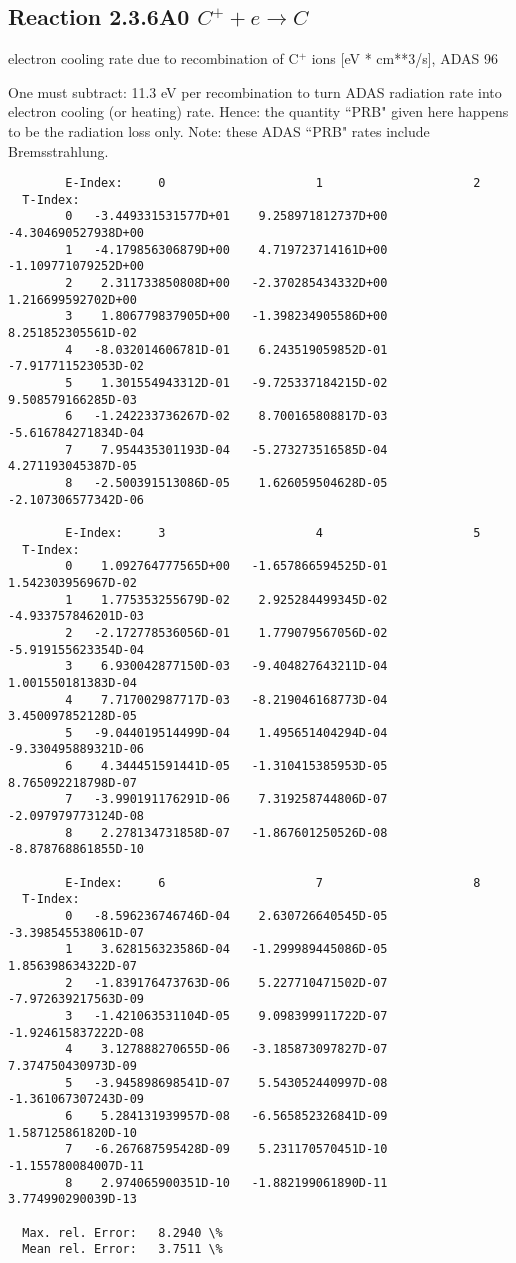 \documentclass[12pt,dvipdfmx]{article}
\begin{document}
\subsection{
  Reaction 2.3.6A0  $C^+ + e \rightarrow C  $
}
electron cooling rate due to recombination of C$^+$ ions [eV * cm**3/s],
ADAS 96

One must subtract: 11.3 eV per recombination to turn ADAS radiation
rate into electron cooling (or heating) rate. Hence: the quantity
``PRB" given here happens to be the radiation loss only. Note: these
ADAS ``PRB" rates include Bremsstrahlung.

\begin{small}\begin{verbatim}
        E-Index:     0                     1                     2
  T-Index:
        0   -3.449331531577D+01    9.258971812737D+00   -4.304690527938D+00
        1   -4.179856306879D+00    4.719723714161D+00   -1.109771079252D+00
        2    2.311733850808D+00   -2.370285434332D+00    1.216699592702D+00
        3    1.806779837905D+00   -1.398234905586D+00    8.251852305561D-02
        4   -8.032014606781D-01    6.243519059852D-01   -7.917711523053D-02
        5    1.301554943312D-01   -9.725337184215D-02    9.508579166285D-03
        6   -1.242233736267D-02    8.700165808817D-03   -5.616784271834D-04
        7    7.954435301193D-04   -5.273273516585D-04    4.271193045387D-05
        8   -2.500391513086D-05    1.626059504628D-05   -2.107306577342D-06

        E-Index:     3                     4                     5
  T-Index:
        0    1.092764777565D+00   -1.657866594525D-01    1.542303956967D-02
        1    1.775353255679D-02    2.925284499345D-02   -4.933757846201D-03
        2   -2.172778536056D-01    1.779079567056D-02   -5.919155623354D-04
        3    6.930042877150D-03   -9.404827643211D-04    1.001550181383D-04
        4    7.717002987717D-03   -8.219046168773D-04    3.450097852128D-05
        5   -9.044019514499D-04    1.495651404294D-04   -9.330495889321D-06
        6    4.344451591441D-05   -1.310415385953D-05    8.765092218798D-07
        7   -3.990191176291D-06    7.319258744806D-07   -2.097979773124D-08
        8    2.278134731858D-07   -1.867601250526D-08   -8.878768861855D-10

        E-Index:     6                     7                     8
  T-Index:
        0   -8.596236746746D-04    2.630726640545D-05   -3.398545538061D-07
        1    3.628156323586D-04   -1.299989445086D-05    1.856398634322D-07
        2   -1.839176473763D-06    5.227710471502D-07   -7.972639217563D-09
        3   -1.421063531104D-05    9.098399911722D-07   -1.924615837222D-08
        4    3.127888270655D-06   -3.185873097827D-07    7.374750430973D-09
        5   -3.945898698541D-07    5.543052440997D-08   -1.361067307243D-09
        6    5.284131939957D-08   -6.565852326841D-09    1.587125861820D-10
        7   -6.267687595428D-09    5.231170570451D-10   -1.155780084007D-11
        8    2.974065900351D-10   -1.882199061890D-11    3.774990290039D-13

  Max. rel. Error:   8.2940 \%
  Mean rel. Error:   3.7511 \%



\end{verbatim}\end{small}
\end{document}
